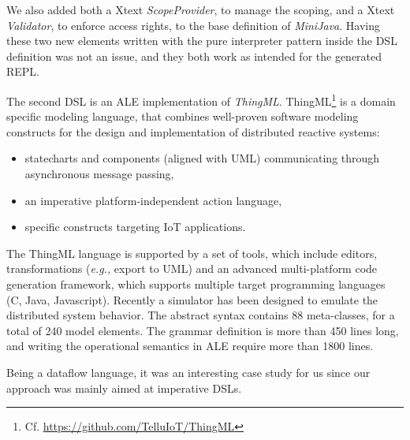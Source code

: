 
We also added both a Xtext \textit{ScopeProvider}, to manage the scoping, and a Xtext \textit{Validator}, to enforce access rights, to the base definition of \textit{MiniJava}.
Having these two new elements written with the pure interpreter pattern inside the DSL definition was not an issue, and they both work as intended for the generated REPL.

The second DSL is an ALE implementation of \textit{ThingML}. ThingML\footnote{Cf. \url{https://github.com/TelluIoT/ThingML}} is a domain specific modeling language, that combines well-proven software modeling constructs for the design and implementation of distributed reactive systems:

\begin{itemize}
    \item statecharts and components (aligned with UML) communicating through asynchronous message passing,
\item an imperative platform-independent action language,
\item specific constructs targeting IoT applications.
\end{itemize}

The ThingML language is supported by a set of tools, which include editors, transformations (\emph{e.g.,} export to UML) and an advanced multi-platform code generation framework, which supports multiple target programming languages (C, Java, Javascript). Recently a simulator has been designed to emulate the distributed system behavior. The abstract syntax contains 88 meta-classes, for a total of 240 model elements. The grammar definition is more than 450 lines long, and writing the operational semantics in ALE require more than 1800 lines.

Being a dataflow language, it was an interesting case study for us since our approach was mainly aimed at imperative DSLs.

